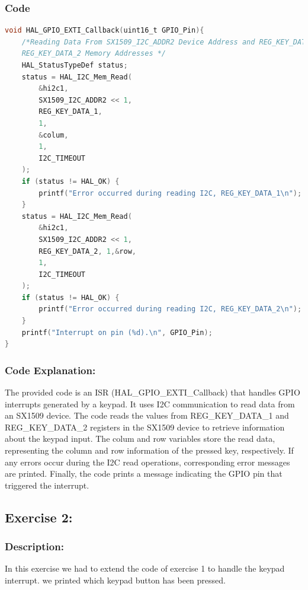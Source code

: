 \documentclass[english]{article}
\begin{document}
\subsubsection{Code}
\begin{lstlisting}[language=C, caption={Interrupt Callback}]
void HAL_GPIO_EXTI_Callback(uint16_t GPIO_Pin){
    /*Reading Data From SX1509_I2C_ADDR2 Device Address and REG_KEY_DATA_1 and 
    REG_KEY_DATA_2 Memory Addresses */
    HAL_StatusTypeDef status;
    status = HAL_I2C_Mem_Read(
        &hi2c1,
        SX1509_I2C_ADDR2 << 1,
        REG_KEY_DATA_1,
        1,
        &colum,
        1,
        I2C_TIMEOUT
    );
    if (status != HAL_OK) {
        printf("Error occurred during reading I2C, REG_KEY_DATA_1\n");
    }
    status = HAL_I2C_Mem_Read(
        &hi2c1,
        SX1509_I2C_ADDR2 << 1,
        REG_KEY_DATA_2, 1,&row,
        1, 
        I2C_TIMEOUT
    );
    if (status != HAL_OK) {
        printf("Error occurred during reading I2C, REG_KEY_DATA_2\n");
    }
    printf("Interrupt on pin (%d).\n", GPIO_Pin);
}
\end{lstlisting}

\subsubsection{Code Explanation:}
The provided code is an ISR (HAL\_GPIO\_EXTI\_Callback) that handles 
GPIO interrupts generated by a keypad. It uses I2C communication to 
read data from an SX1509 device. The code reads the values from REG\_KEY\_DATA\_1
 and REG\_KEY\_DATA\_2 registers in the SX1509 device to retrieve information
  about the keypad input. The colum and row variables store the read data,
   representing the column and row information of the pressed key, respectively.
    If any errors occur during the I2C read operations, corresponding error 
    messages are printed. Finally, the code prints a message indicating the 
    GPIO pin that triggered the interrupt.
\newpage
\subsection{Exercise 2:}
\subsubsection{Description:}
In this exercise we had to extend the code of exercise 1 to handle the keypad interrupt. we printed which keypad button has been pressed.
\end{document}
